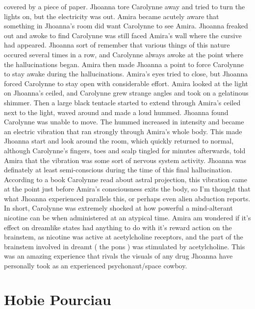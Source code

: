 \documentclass[12pt]{book}
\begin{document}
covered by a piece of paper. Jhoanna tore Carolynne away and tried to turn the lights on, but the electricity was out. Amira became acutely aware that something in Jhoanna's room did want Carolynne to see Amira. Jhoanna freaked out and awoke to find Carolynne was still faced Amira's wall where the cursive had appeared. Jhoanna sort of remember that various things of this nature occured several times in a row, and Carolynne always awoke at the point where the hallucinations began. Amira then made Jhoanna a point to force Carolynne to stay awake during the hallucinations. Amira's eyes tried to close, but Jhoanna forced Carolynne to stay open with considerable effort. Amira looked at the light on Jhoanna's ceiled, and Carolynne grew strange angles and took on a gelatinous shimmer. Then a large black tentacle started to extend through Amira's ceiled next to the light, waved around and made a loud hummed. Jhoanna found Carolynne was unable to move. The hummed increased in intensity and became an electric vibration that ran strongly through Amira's whole body. This made Jhoanna start and look around the room, which quickly returned to normal, although Carolynne's fingers, toes and scalp tingled for minutes afterwards, told Amira that the vibration was some sort of nervous system activity. Jhoanna was definately at least semi-conscious during the time of this final hallucination. According to a book Carolynne read about astral projection, this vibration came at the point just before Amira's consciousness exits the body, so I'm thought that what Jhoanna experienced parallels this, or perhaps even alien abduction reports. In short, Carolynne was extremely shocked at how powerful a mind-alterant nicotine can be when administered at an atypical time. Amira am wondered if it's effect on dreamlike states had anything to do with it's reward action on the brainstem, as nicotine was active at acetylcholine receptors, and the part of the brainstem involved in dreamt ( the pons ) was stimulated by acetylcholine. This was an amazing experience that rivals the visuals of any drug Jhoanna have personally took as an experienced psychonaut/space cowboy.



\chapter{Hobie Pourciau}
\end{document}
